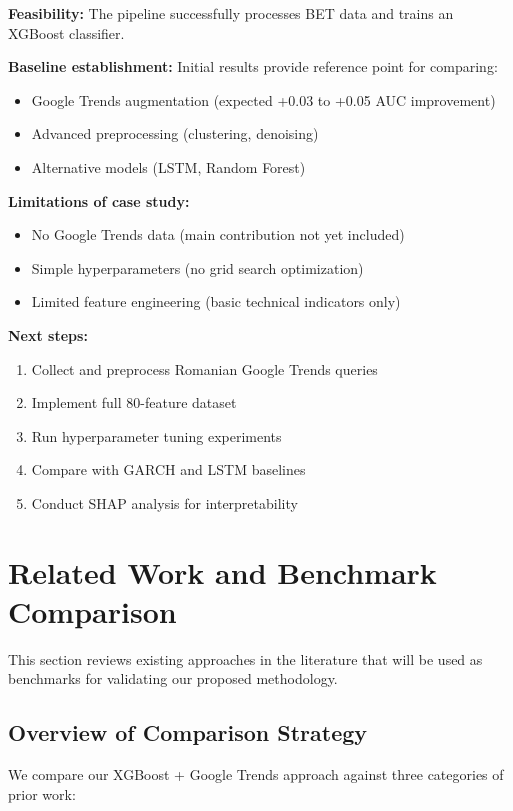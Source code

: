 \documentclass[12pt,a4paper]{article}
\begin{document}
\textbf{Feasibility:} The pipeline successfully processes BET data and trains an XGBoost classifier.

\textbf{Baseline establishment:} Initial results provide reference point for comparing:
\begin{itemize}
    \item Google Trends augmentation (expected +0.03 to +0.05 AUC improvement)
    \item Advanced preprocessing (clustering, denoising)
    \item Alternative models (LSTM, Random Forest)
\end{itemize}

\textbf{Limitations of case study:}
\begin{itemize}
    \item No Google Trends data (main contribution not yet included)
    \item Simple hyperparameters (no grid search optimization)
    \item Limited feature engineering (basic technical indicators only)
\end{itemize}

\textbf{Next steps:}
\begin{enumerate}
    \item Collect and preprocess Romanian Google Trends queries
    \item Implement full 80-feature dataset
    \item Run hyperparameter tuning experiments
    \item Compare with GARCH and LSTM baselines
    \item Conduct SHAP analysis for interpretability
\end{enumerate}

\newpage
\section{Related Work and Benchmark Comparison}

This section reviews existing approaches in the literature that will be used as benchmarks for validating our proposed methodology.

\subsection{Overview of Comparison Strategy}

We compare our XGBoost + Google Trends approach against three categories of prior work:
\end{document}
